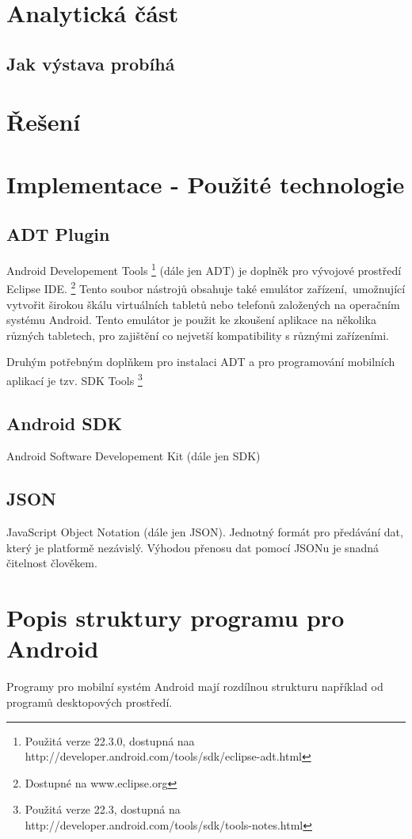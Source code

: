 \documentclass[11pt, oneside]{fithesis2}
\begin{document}
\chapter{Analytická část}
\section{Jak výstava probíhá}



\chapter{Řešení}

\chapter{Implementace - Použité technologie}
\section{ADT Plugin}
Android Developement Tools \footnote{Použitá verze 22.3.0, dostupná naa http://developer.android.com/tools/sdk/eclipse-adt.html} (dále jen ADT) je doplněk pro vývojové prostředí Eclipse IDE. \footnote{Dostupné na www.eclipse.org}
Tento soubor nástrojů obsahuje také emulátor zařízení,~umožnující vytvořit širokou škálu virtuálních tabletů nebo telefonů založených na operačním systému Android.
Tento emulátor je použit ke zkoušení aplikace na několika různých tabletech, pro zajištění co nejvetší kompatibility s různými zařízeními.

Druhým potřebným doplňkem pro instalaci ADT a pro programování mobilních aplikací je tzv. SDK Tools \footnote {Použitá verze 22.3, dostupná na http://developer.android.com/tools/sdk/tools-notes.html}

\section{Android SDK}
Android Software Developement Kit (dále jen SDK)

\section{JSON}
JavaScript Object Notation (dále jen JSON). Jednotný formát pro předávání dat, který je platformě nezávislý. Výhodou přenosu dat pomocí JSONu je snadná čitelnost člověkem. 

\chapter{Popis struktury programu pro Android}
Programy pro mobilní systém Android mají rozdílnou strukturu například od programů desktopových prostředí.
\end{document}
